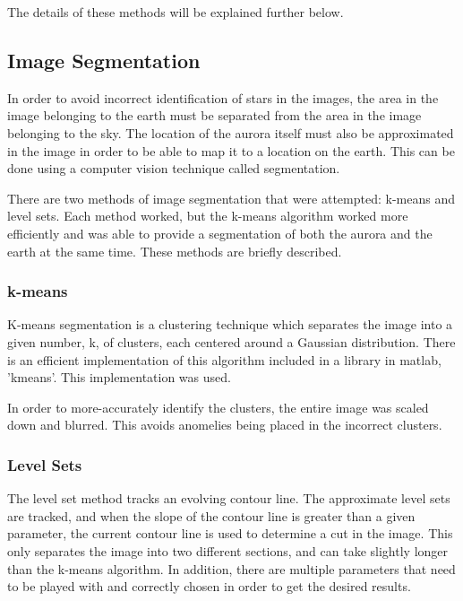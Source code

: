 \documentclass[12pt]{article}
\theoremstyle{definition}
\begin{document}
The details of these methods will be explained further below. 

\subsection{ \bf Image Segmentation }

In order to avoid incorrect identification of stars in the images, the area in the image belonging to the earth must be separated from the area in the image belonging to the sky.  The location of the aurora itself must also be approximated in the image in order to be able to map it to a location on the earth.  This can be done using a computer vision technique called segmentation.

There are two methods of image segmentation that were attempted: k-means and level sets.  Each method worked, but the k-means algorithm worked more efficiently and was able to provide a segmentation of both the aurora and the earth at the same time.  These methods are briefly described.

\subsubsection{ \bf k-means }

K-means segmentation is a clustering technique which separates the image into a given number, k, of clusters, each centered around a Gaussian distribution.  There is an efficient implementation of this algorithm included in a library in matlab, 'kmeans'.  This implementation was used.

In order to more-accurately identify the clusters, the entire image was scaled down and blurred.  This avoids anomelies being placed in the incorrect clusters.

\subsubsection{ \bf Level Sets }

The level set method tracks an evolving contour line.  The approximate level sets are tracked, and when the slope of the contour line is greater than a given parameter, the current contour line is used to determine a cut in the image.  This only separates the image into two different sections, and can take slightly longer than the k-means algorithm.  In addition, there are multiple parameters that need to be played with and correctly chosen in order to get the desired results.
\end{document}
